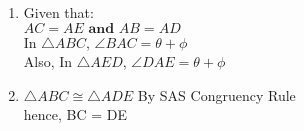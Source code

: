 \renewcommand{\theequation}{\theenumi}
\begin{enumerate}[label=\thesection.\arabic*.,ref=\thesection.\theenumi]
\item
Given that:\\
$AC=AE \textbf{ and } AB=AD$\\
In $\triangle ABC$, $\angle BAC = \theta + \phi$\\
Also, In $\triangle AED$, $\angle DAE = \theta+\phi$\\
\item
$\triangle ABC \cong \triangle ADE$ By SAS Congruency Rule\\
hence, BC = DE
\end{enumerate}
